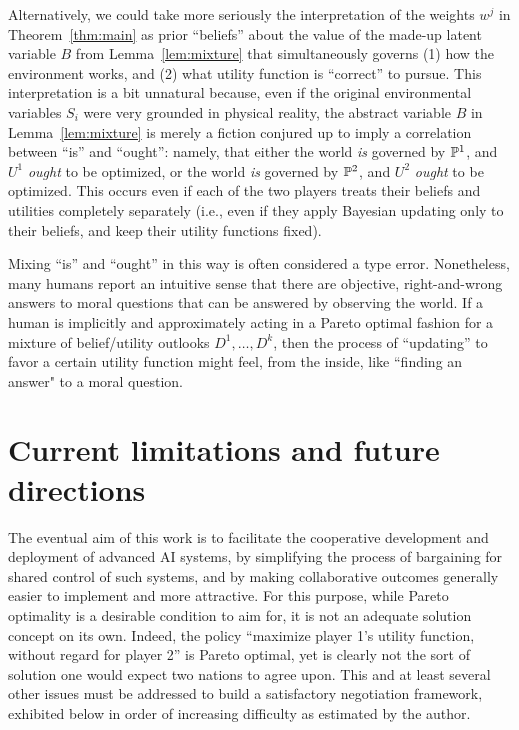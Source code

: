 \documentclass{article}
\newcommand{\bool}{B}
\newcommand{\lem}[1]{Lemma~\ref{lem:#1}}
\newcommand{\thm}[1]{Theorem~\ref{thm:#1}}
\begin{document}
Alternatively, we could take more seriously the interpretation of the weights $w^j$ in \thm{main} as prior ``beliefs'' about the value of the made-up latent variable $\bool $ from \lem{mixture} that simultaneously governs (1) how the environment works, and (2) what utility function is ``correct'' to pursue.  This interpretation is a bit unnatural because, even if the original environmental variables $S_i$ were very grounded in physical reality, the abstract variable $\bool $ in \lem{mixture} is merely a fiction conjured up to imply a correlation between ``is'' and ``ought'': namely, that either the world \emph{is} governed by $\mathbb{P}^1$, and $U^1$ \emph{ought} to be optimized, or the world \emph{is} governed by $\mathbb{P}^2$, and $U^2$ \emph{ought} to be optimized.  This occurs even if each of the two players treats their beliefs and utilities completely separately (i.e., even if they apply Bayesian updating only to their beliefs, and keep their utility functions fixed).

Mixing ``is'' and ``ought'' in this way is often considered a type error.  Nonetheless, many humans report an intuitive sense that there are objective, right-and-wrong answers to moral questions that can be answered by observing the world.  If a human is implicitly and approximately acting in a Pareto optimal fashion for a mixture of belief/utility outlooks $D^1, \ldots, D^k$, then the process of ``updating'' to favor a certain utility function might feel, from the inside, like ``finding an answer" to a moral question.

\section{Current limitations and future directions}

The eventual aim of this work is to facilitate the cooperative development and deployment of advanced AI systems, by simplifying the process of bargaining for shared control of such systems, and by making collaborative outcomes generally easier to implement and more attractive.  For this purpose, while Pareto optimality is a desirable condition to aim for, it is not an adequate solution concept on its own.  Indeed, the policy ``maximize player 1's utility function, without regard for player 2'' is Pareto optimal, yet is clearly not the sort of solution one would expect two nations to agree upon.  This and at least several other issues must be addressed to build a satisfactory negotiation framework, exhibited below in order of increasing difficulty as estimated by the author.
\end{document}

